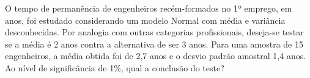 %
%


\begin{exercicioBanco}[\valorquestao]
    O tempo de permanência de engenheiros recém-formados no 1º emprego, em anos, foi estudado considerando um modelo Normal com média e variância desconhecidas. Por analogia com outras categorias profissionais, deseja-se testar se a média é 2 anos contra a alternativa de ser 3 anos. Para uma amostra de 15 engenheiros, a média obtida foi de 2{,}7 anos e o desvio padrão amostral 1{,}4 anos. Ao nível de significância de 1\%, qual a conclusão do teste?
\end{exercicioBanco}

